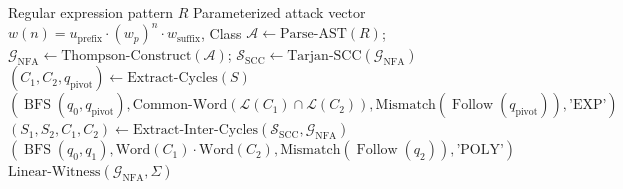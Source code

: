 \documentclass{ieeeaccess}
\begin{document}
\begin{algorithm}[t]
\caption{Adversarial Payload Synthesis via AST-Tarjan Cycle Extraction}
\label{algo:payload_synth}
\small
\begin{algorithmic}[1]
\REQUIRE Regular expression pattern $R$
\ENSURE Parameterized attack vector $w(n) = u_{\mathrm{prefix}} \cdot (w_p)^n \cdot w_{\mathrm{suffix}}$, Class
\STATE $\mathcal{A} \leftarrow \text{Parse-AST}(R)$; $\mathcal{G}_{\mathrm{NFA}} \leftarrow \text{Thompson-Construct}(\mathcal{A})$; $\mathcal{S}_{\mathrm{SCC}} \leftarrow \text{Tarjan-SCC}(\mathcal{G}_{\mathrm{NFA}})$
    \STATE $(C_1, C_2, q_{\mathrm{pivot}}) \leftarrow \text{Extract-Cycles}(S)$
        \RETURN $(\operatorname{BFS}(q_0, q_{\mathrm{pivot}}), \text{Common-Word}(\mathcal{L}(C_1) \cap \mathcal{L}(C_2)), \text{Mismatch}(\operatorname{Follow}(q_{\mathrm{pivot}})), \text{'EXP'})$
    \ENDIF
\ENDFOR
\STATE $(S_1, S_2, C_1, C_2) \leftarrow \text{Extract-Inter-Cycles}(\mathcal{S}_{\mathrm{SCC}}, \mathcal{G}_{\mathrm{NFA}})$
    \RETURN $(\operatorname{BFS}(q_0, q_1), \text{Word}(C_1) \cdot \text{Word}(C_2), \text{Mismatch}(\operatorname{Follow}(q_2)), \text{'POLY'})$
\ENDIF
\RETURN $\text{Linear-Witness}(\mathcal{G}_{\mathrm{NFA}}, \Sigma)$
\end{algorithmic}
\end{algorithm}
\end{document}

